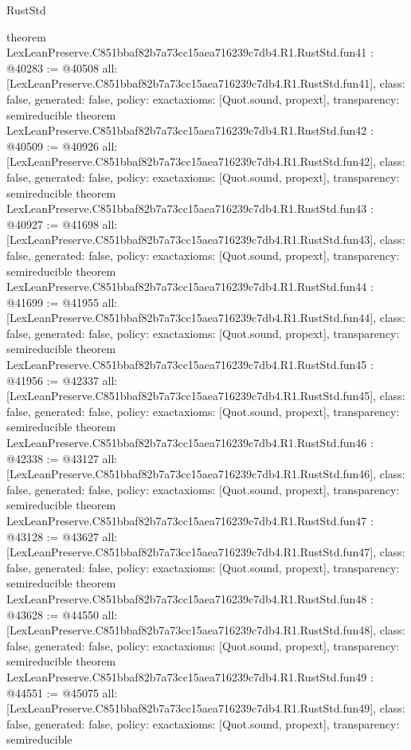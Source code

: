 \begin{lexlean}{RustStd}
\begin{coremodule}
{}
theorem LexLeanPreserve.C851bbaf82b7a73cc15aea716239c7db4.R1.RustStd.fun41 : @40283 := @40508 {
  all: [LexLeanPreserve.C851bbaf82b7a73cc15aea716239c7db4.R1.RustStd.fun41],
  class: false,
  generated: false,
  policy: exact{axioms: [Quot.sound, propext]},
  transparency: semireducible
}
theorem LexLeanPreserve.C851bbaf82b7a73cc15aea716239c7db4.R1.RustStd.fun42 : @40509 := @40926 {
  all: [LexLeanPreserve.C851bbaf82b7a73cc15aea716239c7db4.R1.RustStd.fun42],
  class: false,
  generated: false,
  policy: exact{axioms: [Quot.sound, propext]},
  transparency: semireducible
}
theorem LexLeanPreserve.C851bbaf82b7a73cc15aea716239c7db4.R1.RustStd.fun43 : @40927 := @41698 {
  all: [LexLeanPreserve.C851bbaf82b7a73cc15aea716239c7db4.R1.RustStd.fun43],
  class: false,
  generated: false,
  policy: exact{axioms: [Quot.sound, propext]},
  transparency: semireducible
}
theorem LexLeanPreserve.C851bbaf82b7a73cc15aea716239c7db4.R1.RustStd.fun44 : @41699 := @41955 {
  all: [LexLeanPreserve.C851bbaf82b7a73cc15aea716239c7db4.R1.RustStd.fun44],
  class: false,
  generated: false,
  policy: exact{axioms: [Quot.sound, propext]},
  transparency: semireducible
}
theorem LexLeanPreserve.C851bbaf82b7a73cc15aea716239c7db4.R1.RustStd.fun45 : @41956 := @42337 {
  all: [LexLeanPreserve.C851bbaf82b7a73cc15aea716239c7db4.R1.RustStd.fun45],
  class: false,
  generated: false,
  policy: exact{axioms: [Quot.sound, propext]},
  transparency: semireducible
}
theorem LexLeanPreserve.C851bbaf82b7a73cc15aea716239c7db4.R1.RustStd.fun46 : @42338 := @43127 {
  all: [LexLeanPreserve.C851bbaf82b7a73cc15aea716239c7db4.R1.RustStd.fun46],
  class: false,
  generated: false,
  policy: exact{axioms: [Quot.sound, propext]},
  transparency: semireducible
}
theorem LexLeanPreserve.C851bbaf82b7a73cc15aea716239c7db4.R1.RustStd.fun47 : @43128 := @43627 {
  all: [LexLeanPreserve.C851bbaf82b7a73cc15aea716239c7db4.R1.RustStd.fun47],
  class: false,
  generated: false,
  policy: exact{axioms: [Quot.sound, propext]},
  transparency: semireducible
}
theorem LexLeanPreserve.C851bbaf82b7a73cc15aea716239c7db4.R1.RustStd.fun48 : @43628 := @44550 {
  all: [LexLeanPreserve.C851bbaf82b7a73cc15aea716239c7db4.R1.RustStd.fun48],
  class: false,
  generated: false,
  policy: exact{axioms: [Quot.sound, propext]},
  transparency: semireducible
}
theorem LexLeanPreserve.C851bbaf82b7a73cc15aea716239c7db4.R1.RustStd.fun49 : @44551 := @45075 {
  all: [LexLeanPreserve.C851bbaf82b7a73cc15aea716239c7db4.R1.RustStd.fun49],
  class: false,
  generated: false,
  policy: exact{axioms: [Quot.sound, propext]},
  transparency: semireducible
}
\end{coremodule}
\end{lexlean}

